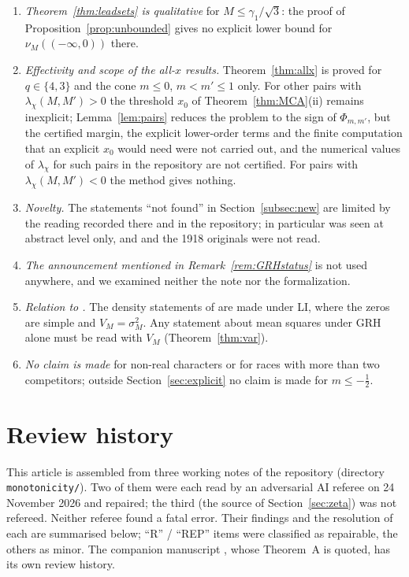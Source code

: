 \documentclass[11pt]{amsart}
\theoremstyle{definition}
\numberwithin{equation}{section}
\begin{document}
\begin{enumerate}
\item \emph{Theorem~\ref{thm:leadsets} is qualitative} for
$M\le\gamma_1/\sqrt3$: the proof of
Proposition~\ref{prop:unbounded} gives no explicit lower bound for
$\nu_M((-\infty,0))$ there.
\item \emph{Effectivity and scope of the all-$x$ results.}
Theorem~\ref{thm:allx} is proved for $q\in\{4,3\}$ and the cone
$m\le0$, $m<m'\le1$ only. For other pairs with
$\lambda_\chi(M,M')>0$ the threshold $x_0$ of
Theorem~\ref{thm:MCA}(ii) remains inexplicit; Lemma~\ref{lem:pairs}
reduces the problem to the sign of $\Phi_{m,m'}$, but the certified
margin, the explicit lower-order terms and the finite computation
that an explicit $x_0$ would need were not carried out, and the
numerical values of $\lambda_\chi$ for such pairs in the repository
are not certified. For pairs with $\lambda_\chi(M,M')<0$ the method
gives nothing.
\item \emph{Novelty.} The statements ``not found'' in
Section~\ref{subsec:new} are limited by the reading recorded there
and in the repository; in particular \cite{LWS26} was seen at
abstract level only, and \cite{Suz25,Fuj88} and the 1918 originals
were not read.
\item \emph{The announcement mentioned in
Remark~\ref{rem:GRHstatus}} is not used anywhere, and we examined
neither the note nor the formalization.
\item \emph{Relation to \cite{WR}.} The density statements of
\cite{WR} are made under LI, where the zeros are simple and
$V_M=\sigma_M^2$. Any statement about mean squares under GRH alone
must be read with $V_M$ (Theorem~\ref{thm:var}).
\item \emph{No claim is made} for non-real characters or for races
with more than two competitors; outside
Section~\ref{sec:explicit} no claim is made for $m\le-\tfrac12$.
\end{enumerate}

\appendix
\section{Review history}\label{sec:review}

This article is assembled from three working notes of the repository
(directory \texttt{monotonicity/}). Two of them were each read by an
adversarial AI referee on 24 November 2026 and repaired; the third
(the source of Section~\ref{sec:zeta}) was not refereed. Neither
referee found a fatal error. Their findings and the resolution of
each are summarised below; ``R'' / ``REP'' items were classified as
repairable, the others as minor. The companion manuscript \cite{MC},
whose Theorem~A is quoted, has its own review history.
\end{document}
